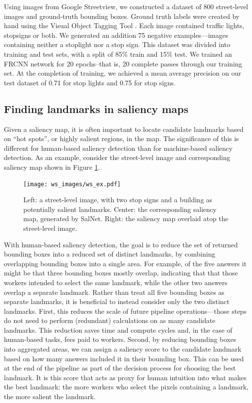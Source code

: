 Using images from Google Streetview, we constructed a dataset of 800 street-level images and ground-truth bounding boxes. Ground truth labels were created by hand using the Visual Object Tagging Tool \cite{vott}. Each image contained traffic lights, stopsigns or both. We generated an addition 75 negative examples---images containing neither a stoplight nor a stop sign. This dataset was divided into training and test sets, with a split of 85\% train and 15\% test. We trained an FRCNN network for 20 epochs--that is, 20 complete passes through our training set. At the completion of training, we achieved a mean average precision on our test dataset of 0.71 for stop lights and 0.75 for stop signs.

\subsection{Finding landmarks in saliency maps}
Given a saliency map, it is often important to locate candidate landmarks based on “hot spots”, or highly salient regions, in the map. The significance of this is different for human-based saliency detection than for machine-based saliency detection. As an example, consider the street-level image and corresponding saliency map shown in Figure \ref{fig:ws:ex}.

\begin{figure}[htbp]
  \centering
  \texttt{[image: ws\_images/ws\_ex.pdf]}
  \caption{Left: a street-level image, with two stop signs and a building as potentially salient landmarks. Center: the corresponding saliency map, generated by SalNet. Right: the saliency map overlaid atop the street-level image.}
  \label{fig:ws:ex}
\end{figure}

With human-based saliency detection, the goal is to reduce the set of returned bounding boxes into a reduced set of distinct landmarks, by combining overlapping bounding boxes into a single area. For example, of the five answers it might be that three bounding boxes mostly overlap, indicating that that those workers intended to select the same landmark, while the other two answers overlap a separate landmark. Rather than treat all five bounding boxes as separate landmarks, it is beneficial to instead consider only the two distinct landmarks. First, this reduces the scale of future pipeline operations---those steps do not need to perform (redundant) calculations on as many candidate landmarks. This reduction saves time and compute cycles and, in the case of human-based tasks, fees paid to workers. Second, by reducing bounding boxes into aggregated areas, we can assign a saliency score to the candidate landmark based on how many answers included it in their bounding box. This can be used at the end of the pipeline as part of the decision process for choosing the best landmark. It is this score that acts as proxy for human intuition into what makes the best landmark: the more workers who select the pixels containing a landmark, the more salient the landmark.

